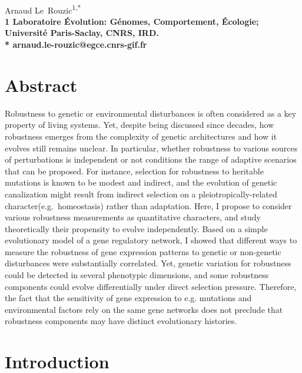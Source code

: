 \documentclass[10pt,a4paper]{article}
\title{}
\date{}
\begin{document}
\vspace*{0.35in}

\begin{flushleft}
{\Large
\textbf{}
}
\newline
\\
Arnaud Le~Rouzic\textsuperscript{1,*}
\\
\bigskip
\bf{1} Laboratoire Évolution: Génomes, Comportement, Écologie; Université Paris-Saclay, CNRS, IRD.
\\
\bigskip
* arnaud.le-rouzic@egce.cnrs-gif.fr

\end{flushleft}

\section*{Abstract}

Robustness to genetic or environmental disturbances is often considered as a key property of living systems. Yet, despite being discussed since decades, how robustness emerges from the complexity of genetic architectures and how it evolves still remains unclear. In particular, whether robustness to various sources of perturbations is independent or not conditions the range of adaptive scenarios that can be proposed. For instance, selection for robustness to heritable mutations is known to be modest and indirect, and the evolution of genetic canalization might result from indirect selection on a pleiotropically-related character(e.g.\ homeostasis) rather than adaptation. Here, I propose to consider various robustness measurements as quantitative characters, and study theoretically their propensity to evolve independently. Based on a simple evolutionary model of a gene regulatory network, I showed that different ways to measure the robustness of gene expression patterns to genetic or non-genetic disturbances were substantially correlated. Yet, genetic variation for robustness could be detected in several phenotypic dimensions, and some robustness components could evolve differentially under direct selection pressure. Therefore, the fact that the sensitivity of gene expression to e.g. mutations and environmental factors rely on the same gene networks does not preclude that robustness components may have distinct evolutionary histories. 

\linenumbers

\section{Introduction}
\end{document}
